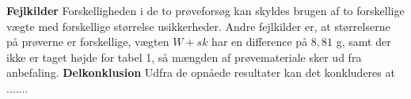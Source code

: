 \textbf{Fejlkilder}
\newline
Forskelligheden i de to prøveforsøg kan skyldes brugen af to forskellige vægte med forskellige størrelse usikkerheder. Andre fejlkilder er, at størrelserne på prøverne er forskellige, vægten $W+sk$ har en difference på $8,\!81$ g, samt der ikke er taget højde for tabel 1, så mængden af prøvemateriale sker ud fra anbefaling.
\newline
\newline
\textbf{Delkonklusion}
\newline
Udfra de opnåede resultater kan det konkluderes at .......
